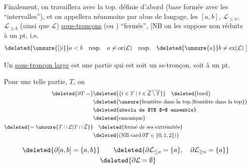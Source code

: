 Finalement, on travaillera avec la top. définie d'abord (base formée avec les ``intervalles''), et on appellera néanmoins par abus de langage, les $[a,b]$, $\mathcal L_{\leq a}$, $\mathcal L_{\geq b}$ (ainsi que $\mathcal L$) \uline{sous-tronçons}  (ou ) ``fermés'', [NB on les suppose non réduits à un pt, i.e.
\[
\deleted{\unsure{[|i}} a<b\quad \text{resp.}\quad a\ne\mathrm{or}(\mathcal L)\quad \text{resp.}\quad \deleted{\unsure{a}}b\ne\mathrm{ex}(\mathcal L)\;]
\]

Un \uline{sous-tronçon  large} est une  partie qui est soit un ss-tronçon, soit  à un pt.

Pour une telle partie, $T$, on
\[
\begin{aligned}
\deleted{\partial T=}&\deleted{\{t\in T\mid t\in \overline{\mathcal L\setminus T}\}}\quad\text{\deleted{bord}}\\
 &\text{\deleted{\unsure{frontière dans la top.|frontière dans la top}}}\\
 &\text{\deleted{absolu de $T$ $=$ ensemble}}\\
 &\text{\deleted{canonique}}\\
 \deleted{={}\unsure{T\cap\mathcal L|T\cap\overline{\mathcal L}}}&\quad\text{\deleted{fermé de ses extrémités}}\\
 &\deleted{(\mathrm{NB}\ \mathrm{card}\,\partial T\in\{0,1,2\})}
\end{aligned}
\]


\[
\begin{aligned}
 \deleted{\partial[a,b]=\{a,b\}}&\qquad \deleted{\partial \mathcal L_{\leq a}=\{a\},\quad \partial \mathcal L_{\geq a}=\{a\}}\\
 &\deleted{\partial\mathcal L=\emptyset}
\end{aligned}
\]

